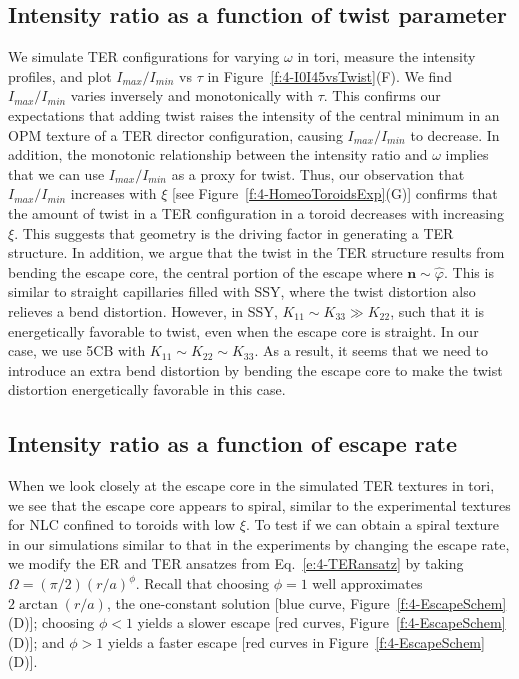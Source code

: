 \subsection{Intensity ratio as a function of twist parameter}
We simulate TER configurations for varying $\omega$ in tori, measure the intensity profiles, and plot $I_{max}/I_{min}$ vs $\tau$ in Figure~\ref{f:4-I0I45vsTwist}(F).
We find $I_{max}/I_{min}$ varies inversely and monotonically with $\tau$.
This confirms our expectations that adding twist raises the intensity of the central minimum in an OPM texture of a TER director configuration, causing $I_{max}/I_{min}$ to decrease.
In addition, the monotonic relationship between the intensity ratio and $\omega$ implies that we can use $I_{max}/I_{min}$ as a proxy for twist.
Thus, our observation that  $I_{max}/I_{min}$ increases with $\xi$ [see Figure~\ref{f:4-HomeoToroidsExp}(G)] confirms that the amount of twist in a TER configuration in a toroid decreases with increasing $\xi$.
This suggests that geometry is the driving factor in generating a TER structure.
In addition, we argue that the twist in the TER structure results from bending the escape core, the central portion of the escape where $\mathbf{n} \sim \hat{\varphi}$.
This is similar to straight capillaries filled with SSY, where the twist distortion also relieves a bend distortion.
However, in SSY, $K_{11} \sim K_{33} \gg K_{22}$, such that it is energetically favorable to twist, even when the escape core is straight.
In our case, we use 5CB with $K_{11} \sim K_{22} \sim K_{33}$.
As a result, it seems that we need to introduce an extra bend distortion by bending the escape core to make the twist distortion energetically favorable in this case.


\subsection{Intensity ratio as a function of escape rate}
When we look closely at the escape core in the simulated TER textures in tori, we see that the escape core appears to spiral, similar to the experimental textures for NLC confined to toroids with low $\xi$.
To test if we can obtain a spiral texture in our simulations similar to that in the experiments by changing the escape rate, we modify the ER and TER ansatzes from Eq.~\ref{e:4-TERansatz} by taking $\Omega = (\pi/2)(r/a)^{\phi}$.
Recall that choosing $\phi = 1$ well approximates $2 \arctan(r/a)$, the one-constant solution [blue curve, Figure~\ref{f:4-EscapeSchem}(D)]; choosing $\phi < 1$ yields a slower escape [red curves, Figure~\ref{f:4-EscapeSchem}(D)]; and $\phi > 1$ yields a faster escape [red curves in Figure~\ref{f:4-EscapeSchem}(D)].

